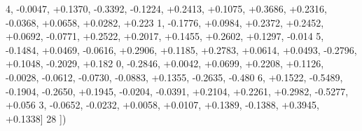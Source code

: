 \begin{DoxyCode}
      4, -0.0047, +0.1370, -0.3392, -0.1224, +0.2413, +0.1075, +0.3686, +0.2316, -0.0368, +0.0658, +0.0282, +0.223
      1, -0.1776, +0.0984, +0.2372, +0.2452, +0.0692, -0.0771, +0.2522, +0.2017, +0.1455, +0.2602, +0.1297, -0.014
      5, -0.1484, +0.0469, -0.0616, +0.2906, +0.1185, +0.2783, +0.0614, +0.0493, -0.2796, +0.1048, -0.2029, +0.182
      0, -0.2846, +0.0042, +0.0699, +0.2208, +0.1126, -0.0028, -0.0612, -0.0730, -0.0883, +0.1355, -0.2635, -0.480
      6, +0.1522, -0.5489, -0.1904, -0.2650, +0.1945, -0.0204, -0.0391, +0.2104, +0.2261, +0.2982, -0.5277, +0.056
      3, -0.0652, -0.0232, +0.0058, +0.0107, +0.1389, -0.1388, +0.3945, +0.1338]
28 ])
\end{DoxyCode}
